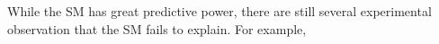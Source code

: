 While the SM has great predictive power, there are still several experimental observation that the SM fails to explain. For example, 
